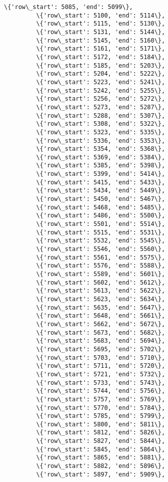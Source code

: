 \documentclass[11pt]{article}
\begin{document}
\begin{Verbatim}[commandchars=\\\{\}]
         \{'row\_start': 5085, 'end': 5099\},
         \{'row\_start': 5100, 'end': 5114\},
         \{'row\_start': 5115, 'end': 5130\},
         \{'row\_start': 5131, 'end': 5144\},
         \{'row\_start': 5145, 'end': 5160\},
         \{'row\_start': 5161, 'end': 5171\},
         \{'row\_start': 5172, 'end': 5184\},
         \{'row\_start': 5185, 'end': 5203\},
         \{'row\_start': 5204, 'end': 5222\},
         \{'row\_start': 5223, 'end': 5241\},
         \{'row\_start': 5242, 'end': 5255\},
         \{'row\_start': 5256, 'end': 5272\},
         \{'row\_start': 5273, 'end': 5287\},
         \{'row\_start': 5288, 'end': 5307\},
         \{'row\_start': 5308, 'end': 5322\},
         \{'row\_start': 5323, 'end': 5335\},
         \{'row\_start': 5336, 'end': 5353\},
         \{'row\_start': 5354, 'end': 5368\},
         \{'row\_start': 5369, 'end': 5384\},
         \{'row\_start': 5385, 'end': 5398\},
         \{'row\_start': 5399, 'end': 5414\},
         \{'row\_start': 5415, 'end': 5433\},
         \{'row\_start': 5434, 'end': 5449\},
         \{'row\_start': 5450, 'end': 5467\},
         \{'row\_start': 5468, 'end': 5485\},
         \{'row\_start': 5486, 'end': 5500\},
         \{'row\_start': 5501, 'end': 5514\},
         \{'row\_start': 5515, 'end': 5531\},
         \{'row\_start': 5532, 'end': 5545\},
         \{'row\_start': 5546, 'end': 5560\},
         \{'row\_start': 5561, 'end': 5575\},
         \{'row\_start': 5576, 'end': 5588\},
         \{'row\_start': 5589, 'end': 5601\},
         \{'row\_start': 5602, 'end': 5612\},
         \{'row\_start': 5613, 'end': 5622\},
         \{'row\_start': 5623, 'end': 5634\},
         \{'row\_start': 5635, 'end': 5647\},
         \{'row\_start': 5648, 'end': 5661\},
         \{'row\_start': 5662, 'end': 5672\},
         \{'row\_start': 5673, 'end': 5682\},
         \{'row\_start': 5683, 'end': 5694\},
         \{'row\_start': 5695, 'end': 5702\},
         \{'row\_start': 5703, 'end': 5710\},
         \{'row\_start': 5711, 'end': 5720\},
         \{'row\_start': 5721, 'end': 5732\},
         \{'row\_start': 5733, 'end': 5743\},
         \{'row\_start': 5744, 'end': 5756\},
         \{'row\_start': 5757, 'end': 5769\},
         \{'row\_start': 5770, 'end': 5784\},
         \{'row\_start': 5785, 'end': 5799\},
         \{'row\_start': 5800, 'end': 5811\},
         \{'row\_start': 5812, 'end': 5826\},
         \{'row\_start': 5827, 'end': 5844\},
         \{'row\_start': 5845, 'end': 5864\},
         \{'row\_start': 5865, 'end': 5881\},
         \{'row\_start': 5882, 'end': 5896\},
         \{'row\_start': 5897, 'end': 5909\},

\end{Verbatim}
\end{document}
